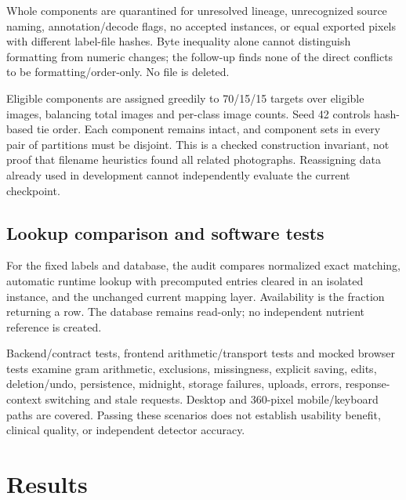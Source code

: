 \documentclass[conference]{IEEEtran}
\begin{document}
Whole components are quarantined for unresolved lineage, unrecognized source naming, annotation/decode flags, no accepted instances, or equal exported pixels with different label-file hashes. Byte inequality alone cannot distinguish formatting from numeric changes; the follow-up finds none of the direct conflicts to be formatting/order-only. No file is deleted.

Eligible components are assigned greedily to 70/15/15 targets over eligible images, balancing total images and per-class image counts. Seed 42 controls hash-based tie order. Each component remains intact, and component sets in every pair of partitions must be disjoint. This is a checked construction invariant, not proof that filename heuristics found all related photographs. Reassigning data already used in development cannot independently evaluate the current checkpoint.

\subsection{Lookup comparison and software tests}
For the fixed \AuditClasses{} labels and database, the audit compares normalized exact matching, automatic runtime lookup with precomputed entries cleared in an isolated instance, and the unchanged current mapping layer. Availability is the fraction returning a row. The database remains read-only; no independent nutrient reference is created.

Backend/contract tests, frontend arithmetic/transport tests and mocked browser tests examine gram arithmetic, exclusions, missingness, explicit saving, edits, deletion/undo, persistence, midnight, storage failures, uploads, errors, response-context switching and stale requests. Desktop and 360-pixel mobile/keyboard paths are covered. Passing these scenarios does not establish usability benefit, clinical quality, or independent detector accuracy.

\section{Results}
\end{document}
